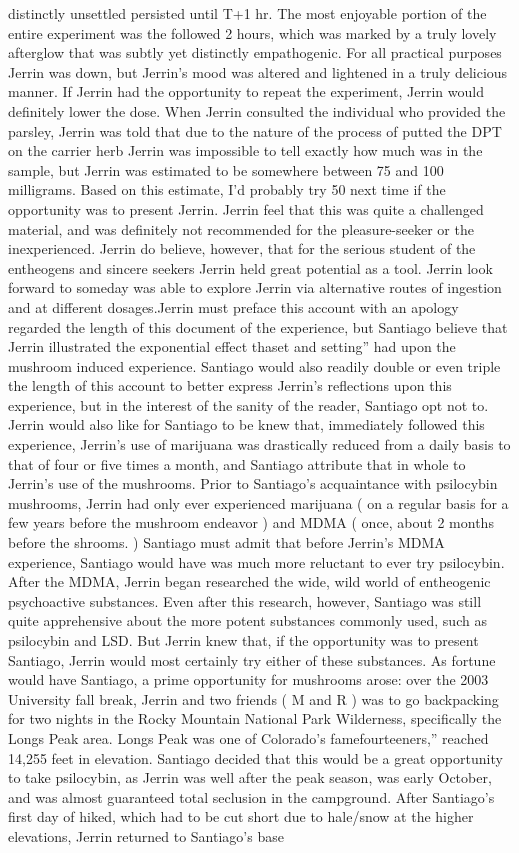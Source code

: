 \documentclass[12pt]{book}
\begin{document}
distinctly unsettled persisted until T+1 hr. The most enjoyable portion of the entire experiment was the followed 2 hours, which was marked by a truly lovely afterglow that was subtly yet distinctly empathogenic. For all practical purposes Jerrin was down, but Jerrin's mood was altered and lightened in a truly delicious manner. If Jerrin had the opportunity to repeat the experiment, Jerrin would definitely lower the dose. When Jerrin consulted the individual who provided the parsley, Jerrin was told that due to the nature of the process of putted the DPT on the carrier herb Jerrin was impossible to tell exactly how much was in the sample, but Jerrin was estimated to be somewhere between 75 and 100 milligrams. Based on this estimate, I'd probably try 50 next time if the opportunity was to present Jerrin. Jerrin feel that this was quite a challenged material, and was definitely not recommended for the pleasure-seeker or the inexperienced. Jerrin do believe, however, that for the serious student of the entheogens and sincere seekers Jerrin held great potential as a tool. Jerrin look forward to someday was able to explore Jerrin via alternative routes of ingestion and at different dosages.Jerrin must preface this account with an apology regarded the length of this document of the experience, but Santiago believe that Jerrin illustrated the exponential effect thaset and setting'' had upon the mushroom induced experience. Santiago would also readily double or even triple the length of this account to better express Jerrin's reflections upon this experience, but in the interest of the sanity of the reader, Santiago opt not to. Jerrin would also like for Santiago to be knew that, immediately followed this experience, Jerrin's use of marijuana was drastically reduced from a daily basis to that of four or five times a month, and Santiago attribute that in whole to Jerrin's use of the mushrooms. Prior to Santiago's acquaintance with psilocybin mushrooms, Jerrin had only ever experienced marijuana ( on a regular basis for a few years before the mushroom endeavor ) and MDMA ( once, about 2 months before the shrooms. ) Santiago must admit that before Jerrin's MDMA experience, Santiago would have was much more reluctant to ever try psilocybin. After the MDMA, Jerrin began researched the wide, wild world of entheogenic psychoactive substances. Even after this research, however, Santiago was still quite apprehensive about the more potent substances commonly used, such as psilocybin and LSD. But Jerrin knew that, if the opportunity was to present Santiago, Jerrin would most certainly try either of these substances. As fortune would have Santiago, a prime opportunity for mushrooms arose: over the 2003 University fall break, Jerrin and two friends ( M and R ) was to go backpacking for two nights in the Rocky Mountain National Park Wilderness, specifically the Longs Peak area. Longs Peak was one of Colorado's famefourteeners,'' reached 14,255 feet in elevation. Santiago decided that this would be a great opportunity to take psilocybin, as Jerrin was well after the peak season, was early October, and was almost guaranteed total seclusion in the campground. After Santiago's first day of hiked, which had to be cut short due to hale/snow at the higher elevations, Jerrin returned to Santiago's base 
\end{document}
